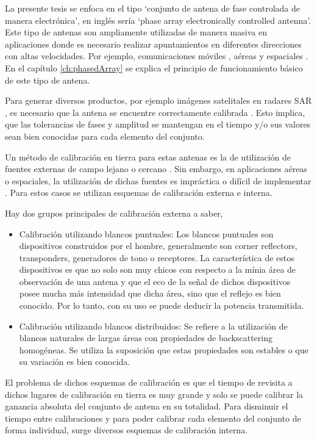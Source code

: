 La presente tesis se enfoca en el tipo \enquote*{conjunto de antena de fase controlada de manera electrónica}, en inglés
sería \enquote*{phase array electronically controlled antenna}. Este tipo de antenas son ampliamente utilizadas de manera masiva
en aplicaciones donde es necesario realizar apuntamientos en diferentes direcciones con altas velocidades. Por ejemplo,
comunicaciones móviles \cite{Chen2012}, aéreas \cite{MHong1989} y espaciales \cite{Shimada1995}\cite{Makhoul2012}. En el capítulo
\ref{ch:phasedArray} se explica el principio de funcionamiento básico de este tipo de antena.

Para generar diversos productos, por ejemplo imágenes satelitales en radares SAR \cite{Freeman1992}, es necesario que la
antena se encuentre correctamente calibrada \cite{Luscombe1990}\cite{Seifert1996}\cite{Dall1994}. Esto implica, que las
tolerancias de fases y amplitud se mantengan en el tiempo y/o sus valores sean bien conocidas para cada elemento del conjunto.

Un método de calibración en tierra para estas antenas es la de utilización de fuentes externas de campo lejano o cercano
\cite{Agrawal2003}. Sin embargo, en aplicaciones aéreas o espaciales, la utilización de dichas fuentes es impráctica o
difícil de implementar \cite{Aumann1989}. Para estos casos se utilizan esquemas de calibración externa e interna.

Hay dos grupos principales de calibración externa a saber,
\begin{itemize}
	\item Calibración utilizando blancos puntuales: Los blancos puntuales son dispositivos construidos por el hombre, generalmente
		son corner reflectors, transponders, generadores de tono o receptores. La característica de estos dispositivos es que no
		solo son muy chicos con respecto a la mínia área de observación de una antena y que el eco de la señal de dichos
		dispositivos posee mucha más intensidad que dicha área, sino que el reflejo es bien conocido. Por lo tanto, con su uso
		se puede deducir la potencia transmitida.
	\item Calibración utilizando blancos distribuidos: Se refiere a la utilización de blancos naturales de largas áreas con
		propiedades de backscattering homogéneas. Se utiliza la suposición que estas propiedades son estables o que su variación es
		bien conocida.
\end{itemize}

El problema de dichos esquemas de calibración es que el tiempo de revisita a dichos lugares de calibración en tierra es muy
grande y solo se puede calibrar la ganancia absoluta del conjunto de antena en su totalidad. Para disminuir el tiempo entre
calibraciones y para poder calibrar cada elemento del conjunto de forma individual, surge diversos esquemas de calibración
interna.

